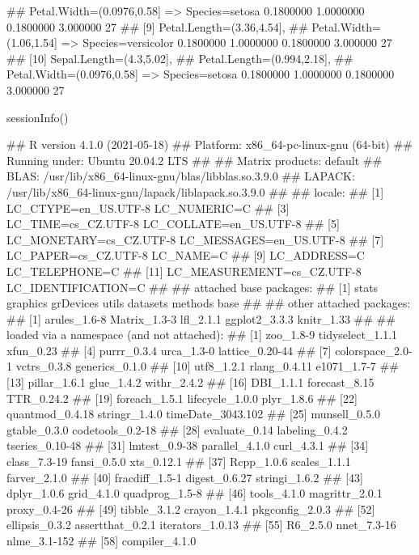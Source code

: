 \documentclass{article}\usepackage[]{graphicx}\usepackage[]{color}
\begin{document}
\begin{Schunk}
\begin{Soutput}
{##       Petal.Width=(0.0976,0.58]} => {Species=setosa}     0.1800000  1.0000000 0.1800000 3.000000    27
## [9]  {Petal.Length=(3.36,4.54],                                                                       
##       Petal.Width=(1.06,1.54]}   => {Species=versicolor} 0.1800000  1.0000000 0.1800000 3.000000    27
## [10] {Sepal.Length=(4.3,5.02],                                                                        
##       Petal.Length=(0.994,2.18],                                                                      
##       Petal.Width=(0.0976,0.58]} => {Species=setosa}     0.1800000  1.0000000 0.1800000 3.000000    27
\end{Soutput}
%
% --end: "casestudy-assoc-arules"
\end{Schunk}

\begin{Schunk}
\begin{Sinput}
sessionInfo()
\end{Sinput}
\begin{Soutput}
## R version 4.1.0 (2021-05-18)
## Platform: x86_64-pc-linux-gnu (64-bit)
## Running under: Ubuntu 20.04.2 LTS
## 
## Matrix products: default
## BLAS:   /usr/lib/x86_64-linux-gnu/blas/libblas.so.3.9.0
## LAPACK: /usr/lib/x86_64-linux-gnu/lapack/liblapack.so.3.9.0
## 
## locale:
##  [1] LC_CTYPE=en_US.UTF-8       LC_NUMERIC=C              
##  [3] LC_TIME=cs_CZ.UTF-8        LC_COLLATE=en_US.UTF-8    
##  [5] LC_MONETARY=cs_CZ.UTF-8    LC_MESSAGES=en_US.UTF-8   
##  [7] LC_PAPER=cs_CZ.UTF-8       LC_NAME=C                 
##  [9] LC_ADDRESS=C               LC_TELEPHONE=C            
## [11] LC_MEASUREMENT=cs_CZ.UTF-8 LC_IDENTIFICATION=C       
## 
## attached base packages:
## [1] stats     graphics  grDevices utils     datasets  methods   base     
## 
## other attached packages:
## [1] arules_1.6-8  Matrix_1.3-3  lfl_2.1.1     ggplot2_3.3.3 knitr_1.33   
## 
## loaded via a namespace (and not attached):
##  [1] zoo_1.8-9         tidyselect_1.1.1  xfun_0.23        
##  [4] purrr_0.3.4       urca_1.3-0        lattice_0.20-44  
##  [7] colorspace_2.0-1  vctrs_0.3.8       generics_0.1.0   
## [10] utf8_1.2.1        rlang_0.4.11      e1071_1.7-7      
## [13] pillar_1.6.1      glue_1.4.2        withr_2.4.2      
## [16] DBI_1.1.1         forecast_8.15     TTR_0.24.2       
## [19] foreach_1.5.1     lifecycle_1.0.0   plyr_1.8.6       
## [22] quantmod_0.4.18   stringr_1.4.0     timeDate_3043.102
## [25] munsell_0.5.0     gtable_0.3.0      codetools_0.2-18 
## [28] evaluate_0.14     labeling_0.4.2    tseries_0.10-48  
## [31] lmtest_0.9-38     parallel_4.1.0    curl_4.3.1       
## [34] class_7.3-19      fansi_0.5.0       xts_0.12.1       
## [37] Rcpp_1.0.6        scales_1.1.1      farver_2.1.0     
## [40] fracdiff_1.5-1    digest_0.6.27     stringi_1.6.2    
## [43] dplyr_1.0.6       grid_4.1.0        quadprog_1.5-8   
## [46] tools_4.1.0       magrittr_2.0.1    proxy_0.4-26     
## [49] tibble_3.1.2      crayon_1.4.1      pkgconfig_2.0.3  
## [52] ellipsis_0.3.2    assertthat_0.2.1  iterators_1.0.13 
## [55] R6_2.5.0          nnet_7.3-16       nlme_3.1-152     
## [58] compiler_4.1.0
\end{Soutput}
\end{Schunk}
\end{document}
